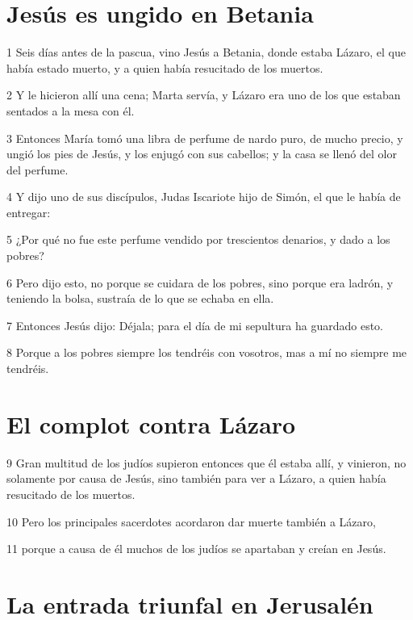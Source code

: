 \section*{Jesús es ungido en Betania}

\par 1 Seis días antes de la pascua, vino Jesús a Betania, donde estaba Lázaro, el que había estado muerto, y a quien había resucitado de los muertos.
\par 2 Y le hicieron allí una cena; Marta servía, y Lázaro era uno de los que estaban sentados a la mesa con él.
\par 3 Entonces María tomó una libra de perfume de nardo puro, de mucho precio, y ungió los pies de Jesús, y los enjugó con sus cabellos; y la casa se llenó del olor del perfume.
\par 4 Y dijo uno de sus discípulos, Judas Iscariote hijo de Simón, el que le había de entregar:
\par 5 ¿Por qué no fue este perfume vendido por trescientos denarios, y dado a los pobres?
\par 6 Pero dijo esto, no porque se cuidara de los pobres, sino porque era ladrón, y teniendo la bolsa, sustraía de lo que se echaba en ella.
\par 7 Entonces Jesús dijo: Déjala; para el día de mi sepultura ha guardado esto.
\par 8 Porque a los pobres siempre los tendréis con vosotros, mas a mí no siempre me tendréis.

\section*{El complot contra Lázaro}

\par 9 Gran multitud de los judíos supieron entonces que él estaba allí, y vinieron, no solamente por causa de Jesús, sino también para ver a Lázaro, a quien había resucitado de los muertos.
\par 10 Pero los principales sacerdotes acordaron dar muerte también a Lázaro,
\par 11 porque a causa de él muchos de los judíos se apartaban y creían en Jesús.

\section*{La entrada triunfal en Jerusalén}

